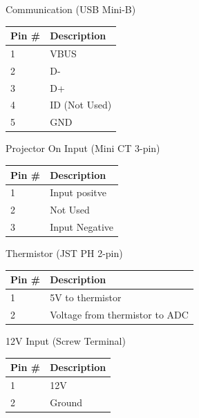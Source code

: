 \documentclass{article}
\begin{document}
\begin{description}[itemsep = 18pt]
  \item[CON1:] Communication (USB Mini-B)
    \begin{center}
        \begin{tabular}{l|l}
            Pin \# & Description \\
            \hline
            1 & VBUS \\
            2 & D- \\
            3 & D+ \\
            4 & ID (Not Used) \\
            5 & GND \\
        \end{tabular}
    \end{center}
  \item[CON2:] Projector On Input (Mini CT 3-pin)
    \begin{center}
        \begin{tabular}{l|l}
            Pin \# & Description \\
            \hline
            1 & Input positve \\
            2 & Not Used \\
            3 & Input Negative \\
        \end{tabular}
    \end{center}
  \item[CON3:] Thermistor (JST PH 2-pin)
    \begin{center}
        \begin{tabular}{l|l}
            Pin \# & Description \\
            \hline
            1 & 5V to thermistor \\
            2 & Voltage from thermistor to ADC \\
        \end{tabular}
    \end{center}
  \item[CON4:] 12V Input (Screw Terminal)
    \begin{center}
        \begin{tabular}{l|l}
            Pin \# & Description \\
            \hline
            1 & 12V \\
            2 & Ground \\
        \end{tabular}
    \end{center}

\end{description}
\end{document}
